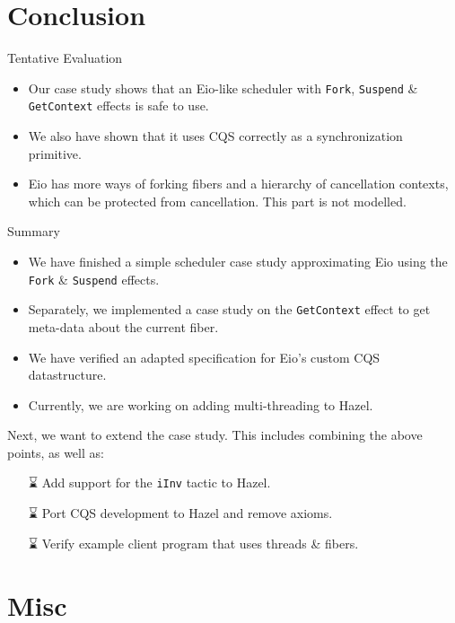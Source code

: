 \documentclass[aspectratio=43]{beamer}
\newcommand{\ocaml}[1]{\texttt{#1}}
\newcommand{\tbd}{{\symfontextra ⌛}}
\newcommand{\efork}{\ocaml{Fork}}
\newcommand{\esuspend}{\ocaml{Suspend}}
\newcommand{\egetctx}{\ocaml{GetContext}}
\begin{document}
\section{Conclusion}
\begin{frame}{Tentative Evaluation}
    \begin{itemize}
        \item Our case study shows that an Eio-like scheduler with \efork{}, \esuspend{} \& \egetctx{} effects is safe to use.
        \item We also have shown that it uses CQS correctly as a synchronization primitive.
        \item Eio has more ways of forking fibers and a hierarchy of cancellation contexts, which can be protected from cancellation. This part is not modelled.
    \end{itemize}
\end{frame}

\begin{frame}{Summary}
    \begin{itemize}
        \item We have finished a simple scheduler case study approximating Eio using the \efork{} \& \esuspend{} effects.
        \item Separately, we implemented a case study on the \egetctx{} effect to get meta-data about the current fiber.
        \item We have verified an adapted specification for Eio's custom CQS datastructure.
        \item Currently, we are working on adding multi-threading to Hazel.
    \end{itemize}
    Next, we want to extend the case study. This includes combining the above points, as well as:
    \begin{itemize}
        \item[\tbd{}] Add support for the \texttt{iInv} tactic to Hazel.
        \item[\tbd{}] Port CQS development to Hazel and remove axioms.
        \item[\tbd{}] Verify example client program that uses threads \& fibers.
    \end{itemize}
\end{frame}

\section{Misc}
\end{document}
